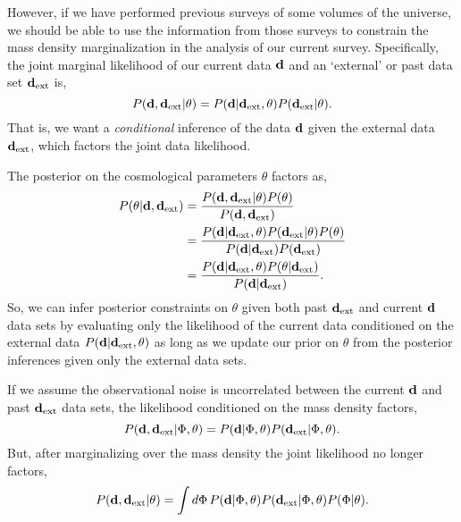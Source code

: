 \documentclass[prd, onecolumn, nofootinbib, floatfix]{revtex4-1}
\begin{document}
However, if we have performed previous surveys of some volumes of the universe, we should be 
able to use the information from those surveys to constrain the mass density marginalization in 
the analysis of our current survey. 
Specifically, the joint marginal likelihood of our current data $\mathbf{d}$ and an `external' or 
past data set $\mathbf{d}_{\rm ext}$ is,
\begin{equation}\label{eq:joint_likelihood}
	P(\mathbf{d}, \mathbf{d}_{\rm ext} | \theta) = 
	P(\mathbf{d} | \mathbf{d}_{\rm ext}, \theta) P(\mathbf{d}_{\rm ext} | \theta).
\end{equation}
That is, we want a \emph{conditional} inference of the data $\mathbf{d}$ given the external data $\mathbf{d}_{\rm ext}$, 
which factors the joint data likelihood.

The posterior on the cosmological parameters $\theta$ factors as,
\begin{align}
	P(\theta | \mathbf{d}, \mathbf{d}_{\rm ext}) &= \frac{P(\mathbf{d}, \mathbf{d}_{\rm ext} | \theta) P(\theta)}{P(\mathbf{d},\mathbf{d}_{\rm ext})}
	\notag\\
	&= \frac{P(\mathbf{d} | \mathbf{d}_{\rm ext},\theta) P(\mathbf{d}_{\rm ext} | \theta) P(\theta)}{P(\mathbf{d} | \mathbf{d}_{\rm ext}) P(\mathbf{d}_{\rm ext})}
	\notag\\
	&= \frac{P(\mathbf{d} | \mathbf{d}_{\rm ext},\theta) P(\theta | \mathbf{d}_{\rm ext})}{P(\mathbf{d} | \mathbf{d}_{\rm ext})}.
	\label{eq:factored_posterior}
\end{align}
So, we can infer posterior constraints on $\theta$ given both past $\mathbf{d}_{\rm ext}$ and current $\mathbf{d}$ data sets 
by evaluating only the likelihood of the current data conditioned on the external data $P(\mathbf{d}|\mathbf{d}_{\rm ext},\theta)$ 
as long as we update our prior on $\theta$ from the posterior inferences given only the external data sets.

If we assume the observational noise is uncorrelated between the current $\mathbf{d}$ and past $\mathbf{d}_{\rm ext}$ data sets,
the likelihood conditioned on the mass density factors,
\begin{equation}
	P(\mathbf{d},\mathbf{d}_{\rm ext} | \Phi, \theta) = P(\mathbf{d} | \Phi, \theta) P(\mathbf{d}_{\rm ext} | \Phi, \theta).
\end{equation}
But, after marginalizing over the mass density the joint likelihood no longer factors,
\begin{equation}\label{eq:marg_likelihood}
	P(\mathbf{d}, \mathbf{d}_{\rm ext} | \theta) = 
	\int d\Phi\, P(\mathbf{d} | \Phi, \theta) P(\mathbf{d}_{\rm ext} | \Phi, \theta) P(\Phi | \theta).
\end{equation}
\end{document}
